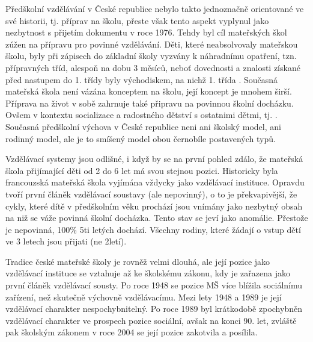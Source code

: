 Předškolní vzdělávání v České republice nebylo takto jednoznačně orientované ve své historii, tj. příprav na školu, přeste však tento aspekt vyplynul jako nezbytnost s přijetím dokumentu  v roce 1976. Tehdy byl cíl mateřských škol zúžen na přípravu pro povinné vzdělávání. Děti, které neabsolvovaly mateřskou školu, byly při zápisech do základní školy vyzvány k náhradnímu opatření, tzn. přípravných tříd, alespoň na dobu 3 měsíců, neboť dovednosti a znalosti získané před nastupem do 1. třídy byly východiskem, na nichž 1. třída . Současná mateřská škola není vázána konceptem na školu, její koncept je mnohem širší. Příprava na život v sobě zahrnuje také připravu na povinnou školní docházku. Ovšem v kontextu socializace a radostného dětství s ostatnimi dětmi, tj. . Současná předškolní výchova v České republice neni ani školský model, ani rodinný model, ale je to smíšený model obou černobíle postavených typů.

Vzdělávací systemy jsou odlišné, i když by se na první pohled zdálo, že mateřská škola přijímající děti od 2 do 6 let má svou stejnou pozici. Historicky byla francouzská mateřská škola vyjímána vždycky jako vzdělávací instituce. Opravdu tvoří první článěk vzdělávací soustavy (ale nepovinný), o to je překvapivější, že cykly, které dítě v předškolním věku prochází jsou vnímány jako nezbytný obsah na niž se váže povinná školní docházka. Tento stav se jeví jako anomálie. Přestože je nepovinná, 100\% 5ti letých dochází. Všechny rodiny, které žádají o vstup dětí ve 3 letech jsou přijati (ne 2letí).

Tradice české mateřské školy je rovněž velmi dlouhá, ale její pozice jako vzdělávací instituce se vztahuje až ke školskému zákonu, kdy je zařazena jako první článěk vzdělávací sousty. Po roce 1948 se pozice MŠ více blížila sociálnímu zařízení, než skutečně výchovně vzdělávacímu. Mezi lety 1948 a 1989 je její vzdělávací charakter nespochybnitelný. Po roce 1989 byl krátkodobě zpochybněn vzdělávací charakter ve prospech pozice sociální, avšak na konci 90. let, zvláště pak školským zákonem v roce 2004 se její pozice zakotvila a posílila. 
